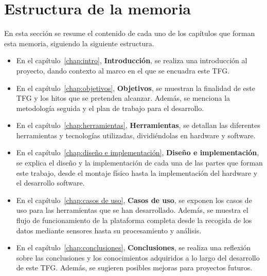 \documentclass[a4paper, 12pt, oneside]{book}
\begin{document}


\section{Estructura de la memoria}
\label{sec:estructura}

En esta sección se resume el contenido de cada uno de los capítulos que forman esta memoria, siguiendo la siguiente estructura.

\begin{itemize}
\item En el capítulo~\ref{chap:intro}, \textbf{Introducción}, se realiza una introducción al proyecto, dando contexto al marco en el que se encuadra este TFG.

\item En el capítulo~\ref{chap:objetivos}, \textbf{Objetivos}, se muestran la finalidad de este TFG y los hitos que se pretenden alcanzar. Además, se menciona la metodología seguida y el plan de trabajo para el desarrollo.

\item En el capítulo~\ref{chap:herramientas}, \textbf{Herramientas}, se detallan las diferentes herramientas y tecnologías utilizadas, dividiéndolas en hardware y software.

\item En el capítulo~\ref{chap:diseño e implementación}, \textbf{Diseño e implementación}, se explica el diseño y la implementación de cada una de las partes que forman este trabajo, desde el montaje físico hasta la implementación del hardware y el desarrollo software.

\item En el capítulo~\ref{chap:casos de uso}, \textbf{Casos de uso}, se exponen los casos de uso para las herramientas que se han desarrollado. Además, se muestra el flujo de funcionamiento de la plataforma completa desde la recogida de los datos mediante sensores hasta su procesamiento y análisis.

\item En el capítulo~\ref{chap:conclusiones}, \textbf{Conclusiones},  se realiza una reflexión sobre las conclusiones y los conocimientos adquiridos a lo largo del desarrollo de este TFG. Además, se sugieren posibles mejoras para proyectos futuros.
\end{itemize}
\end{document}
